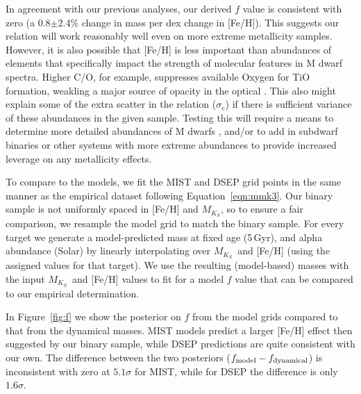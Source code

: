 \documentclass[twocolumn]{aastex62}
\newcommand{\mks}{$M_{K_S}$}
\begin{document}
In agreement with our previous analyses, our derived $f$ value is consistent with zero (a 0.8$\pm$2.4\% change in mass per dex change in [Fe/H]). This suggests our relation will work reasonably well even on more extreme metallicity samples. However, it is also possible that [Fe/H] is less important than abundances of elements that specifically impact the strength of molecular features in M dwarf spectra. Higher C/O, for example, suppresses available Oxygen for TiO formation, weakling a major source of opacity in the optical \citep[e.g., C, O, Ti,][]{2012ApJ...747L..27F,2015ApJ...804...40G,Veyette2016a}. This also might explain some of the extra scatter in the relation ($\sigma_e$) if there is sufficient variance of these abundances in the given sample. Testing this will require a means to determine more detailed abundances of M dwarfs \citep[e.g.,][]{Veyette2017}, and/or to add in subdwarf binaries or other systems with more extreme abundances to provide increased leverage on any metallicity effects. 

To compare to the models, we fit the MIST and DSEP grid points in the same manner as the empirical dataset following Equation~\ref{eqn:mmk3}. Our binary sample is not uniformly spaced in [Fe/H] and \mks, so to ensure a fair comparison, we resample the model grid to match the binary sample. For every target we generate a model-predicted mass at fixed age (5\,Gyr), and alpha abundance (Solar) by linearly interpolating over \mks\ and [Fe/H] (using the assigned values for that target). We use the resulting (model-based) masses with the input \mks\ and [Fe/H] values to fit for a model $f$ value that can be compared to our empirical determination.

In Figure~\ref{fig:f} we show the posterior on $f$ from the model grids compared to that from the dynamical masses. MIST models predict a larger [Fe/H] effect then suggested by our binary sample, while DSEP predictions are quite consistent with our own. The difference between the two posteriors ($f_{\rm{model}}-f_{\rm{dynamical}}$) is inconsistent with zero at $5.1\sigma$ for MIST, while for DSEP the difference is only $1.6\sigma$. 
\end{document}
